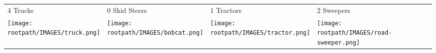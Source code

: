 \begin{tabular}{m{}m{}m{}m{}}
    {\color{ccorange} 4 Trucks} & {\color{ccorange} 0 Skid Steers} & {\color{ccorange} 1 Tractors} & {\color{ccorange} 2 Sweepers} \\
    \texttt{[image: \\rootpath/IMAGES/truck.png]}  & \texttt{[image: \\rootpath/IMAGES/bobcat.png]} & \texttt{[image: \\rootpath/IMAGES/tractor.png]} & \texttt{[image: \\rootpath/IMAGES/road-sweeper.png]}                         
    \end{tabular}